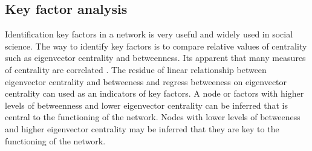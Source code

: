 \subsection*{Key factor analysis}

Identification key factors in a network is very useful and widely used in social science. The way to identify key factors is to compare relative values of centrality such as eigenvector centrality and betweenness. Its apparent that many measures of centrality are correlated \cite{Valente_2008}.  The residue of linear relationship between eigenvector centrality and betweeness and regress betweeness on eigenvector centrality can used as an indicators of key factors. A node or factors with higher levels of betweenness and lower eigenvector centrality can be inferred that is central to the functioning of the network. Nodes with lower levels of betweeness and higher eigenvector centrality may be inferred that they are key to the functioning of the network.